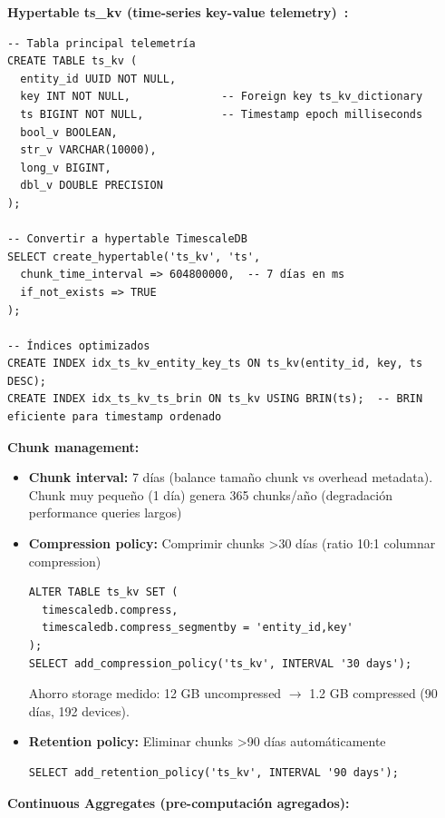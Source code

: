 \textbf{Hypertable ts\_kv (time-series key-value telemetry)~\cite{freedmanTimescaleDBSQLMade2024}:}

\begin{verbatim}
-- Tabla principal telemetría
CREATE TABLE ts_kv (
  entity_id UUID NOT NULL,
  key INT NOT NULL,              -- Foreign key ts_kv_dictionary
  ts BIGINT NOT NULL,            -- Timestamp epoch milliseconds
  bool_v BOOLEAN,
  str_v VARCHAR(10000),
  long_v BIGINT,
  dbl_v DOUBLE PRECISION
);

-- Convertir a hypertable TimescaleDB
SELECT create_hypertable('ts_kv', 'ts', 
  chunk_time_interval => 604800000,  -- 7 días en ms
  if_not_exists => TRUE
);

-- Índices optimizados
CREATE INDEX idx_ts_kv_entity_key_ts ON ts_kv(entity_id, key, ts DESC);
CREATE INDEX idx_ts_kv_ts_brin ON ts_kv USING BRIN(ts);  -- BRIN eficiente para timestamp ordenado
\end{verbatim}

\textbf{Chunk management:}

\begin{itemize}
    \item \textbf{Chunk interval:} 7 días (balance tamaño chunk vs overhead metadata). Chunk muy pequeño (1 día) genera 365 chunks/año (degradación performance queries largos)
    \item \textbf{Compression policy:} Comprimir chunks >30 días (ratio 10:1 columnar compression)
    \begin{verbatim}
ALTER TABLE ts_kv SET (
  timescaledb.compress,
  timescaledb.compress_segmentby = 'entity_id,key'
);
SELECT add_compression_policy('ts_kv', INTERVAL '30 days');
    \end{verbatim}
    Ahorro storage medido: 12 GB uncompressed $\rightarrow$ 1.2 GB compressed (90 días, 192 devices).
    
    \item \textbf{Retention policy:} Eliminar chunks >90 días automáticamente
    \begin{verbatim}
SELECT add_retention_policy('ts_kv', INTERVAL '90 days');
    \end{verbatim}
\end{itemize}

\textbf{Continuous Aggregates (pre-computación agregados):}

